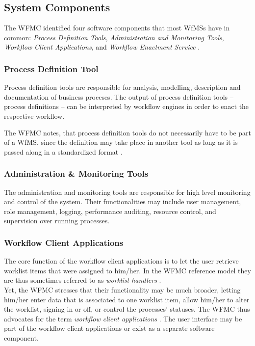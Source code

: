   \subsection{System Components} %
  \label{sub:system_components}
    The \ac{WFMC} identified four software components that most \ac{WfMS}s have in common: \emph{Process Definition Tools}, \emph{Administration and Monitoring Tools}, \emph{Workflow Client Applications}, and \emph{Workflow Enactment Service} \cite{Hollingsworth1995Wfmc}.

    \subsubsection{Process Definition Tool} %
    \label{ssub:process_definition_tool}
      Process definition tools are responsible for analysis, modelling, description and documentation of business proceses. The output of process definition tools -- process definitions -- can be interpreted by workflow engines in order to enact the respective workflow.

      The \ac{WFMC} notes, that process definition tools do not necessarily have to be part of a \ac{WfMS}, since the definition may take place in another tool as long as it is passed along in a standardized format \cite{Hollingsworth1995Wfmc}.    

    \subsubsection{Administration \& Monitoring Tools} %
    \label{ssub:administration_&_monitoring_tools}

      The administration and monitoring tools are responsible for high level monitoring and control of the system. Their functionalities may include user management, role management, logging, performance auditing, resource control, and supervision over running processes.

    \subsubsection{Workflow Client Applications} %
    \label{ssub:workflow_client_applications}
      The core function of the workflow client applications is to let the user retrieve worklist items that were assigned to him/her. In the \ac{WFMC} reference model they are thus sometimes referred to as \emph{worklist handlers} \cite{Hollingsworth1995Wfmc}. \\
      Yet, the \ac{WFMC} stresses that their functionality may be much broader, \eg letting him/her enter data that is associated to one worklist item, allow him/her to alter the worklist, signing in or off, or control the processes' statuses. The \ac{WFMC} thus advocates for the term \emph{workflow client applications} \cite{Hollingsworth1995Wfmc}.
      The user interface may be part of the workflow client applications or exist as a separate software component. 

